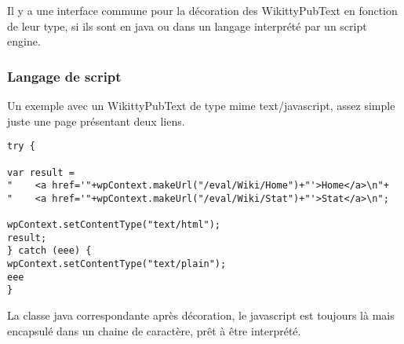 Il y a une interface commune pour la décoration des WikittyPubText en fonction
de leur type, si ils sont en java ou dans un langage interprété par un
script engine.


\subsubsection*{Langage de script}


Un exemple avec un WikittyPubText de type mime text/javascript, assez simple
juste une page présentant deux liens.

\begin{lstlisting}
try {

var result =
"    <a href='"+wpContext.makeUrl("/eval/Wiki/Home")+"'>Home</a>\n"+
"    <a href='"+wpContext.makeUrl("/eval/Wiki/Stat")+"'>Stat</a>\n";

wpContext.setContentType("text/html");
result;
} catch (eee) {
wpContext.setContentType("text/plain");
eee
}
\end{lstlisting}


La classe java correspondante après décoration, le javascript est toujours là
mais encapsulé dans un chaine de caractère, prêt à être interprété.

